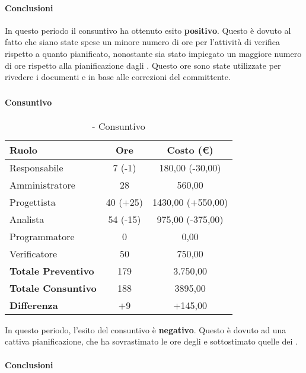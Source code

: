 \documentclass[./PianoDiProgetto.tex]{subfiles}
\begin{document}
	\paragraph{Conclusioni}
	In questo periodo il consuntivo ha ottenuto esito \textbf{positivo}. Questo è dovuto al fatto che siano state spese un minore numero di ore  per l'attività di verifica rispetto a quanto pianificato, nonostante sia stato impiegato un maggiore numero di ore rispetto alla pianificazione dagli \AMMP{}. Questo ore sono state utilizzate per rivedere i documenti \NPdoc{} e \PQdoc{} in base alle correzioni del committente.
	
\subsubsection{\PerPA}
\paragraph{Consuntivo}
	\begin{table}[h]
		\centering
		\begin{tabular}{l * {2}{c}}
			\toprule
			\textbf{Ruolo} & \textbf{Ore} & \textbf{Costo (\euro{})} \\
			\midrule
			Responsabile &	7 (-1) & 180,00 (-30,00) \\
			Amministratore & 28 & 560,00\\
			Progettista & 40 (+25) & 1430,00 (+550,00)\\
			Analista & 54 (-15)  & 975,00 (-375,00)\\
			Programmatore & 0 & 0,00 \\
			Verificatore & 50 & 750,00\\
			\midrule
			\textbf{Totale Preventivo} & 179
 & 3.750,00
 \\		
			\textbf{Totale Consuntivo} & 188 & 3895,00
 \\
			\midrule
			\textbf{Differenza} & +9 & +145,00 \\
			\bottomrule
		\end{tabular}
		\caption{\PerPA{} - Consuntivo}
		In questo periodo, l'esito del consuntivo è \textbf{negativo}. Questo è dovuto ad una cattiva pianificazione, che ha sovrastimato le ore degli \ANP{} e sottostimato quelle dei \PJP{}.
	\end{table}	
	\paragraph{Conclusioni}
	
\end{document}
